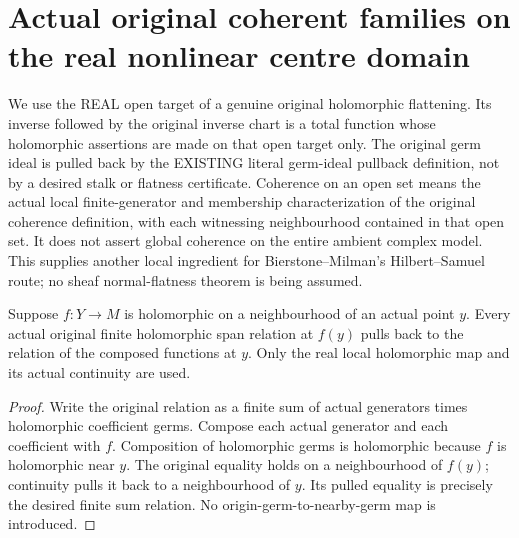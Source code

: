 \section{Actual original coherent families on the real nonlinear centre domain}

We use the REAL open target of a genuine original holomorphic flattening.
Its inverse followed by the original inverse chart is a total function
whose holomorphic assertions are made on that open target only. The
original germ ideal is pulled back by the EXISTING literal germ-ideal
pullback definition, not by a desired stalk or flatness certificate.
Coherence on an open set means the actual local finite-generator and
membership characterization of the original coherence definition,
with each witnessing neighbourhood contained in that open set. It does
not assert global coherence on the entire ambient complex model.
This supplies another local ingredient for Bierstone--Milman's
Hilbert--Samuel route; no sheaf normal-flatness theorem is being assumed.

\begin{lemma}
\label{hir:real-centre-domain-local-span-composition}
\leanok
Suppose $f:Y\to M$ is holomorphic on a neighbourhood of an actual point
$y$. Every actual original finite holomorphic span relation at $f(y)$
pulls back to the relation of the composed functions at $y$. Only the
real local holomorphic map and its actual continuity are used.
\end{lemma}
\begin{proof}
Write the original relation as a finite sum of actual generators times
holomorphic coefficient germs. Compose each actual generator and each
coefficient with $f$. Composition of holomorphic germs is holomorphic
because $f$ is holomorphic near $y$. The original equality holds on a
neighbourhood of $f(y)$; continuity pulls it back to a neighbourhood of
$y$. Its pulled equality is precisely the desired finite sum relation.
No origin-germ-to-nearby-germ map is introduced.
\end{proof}


